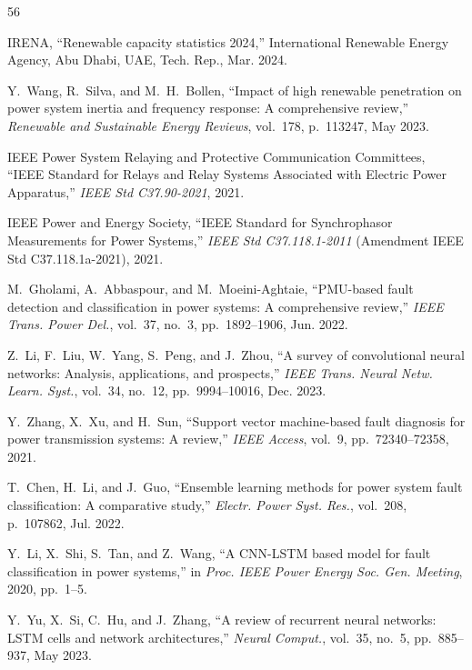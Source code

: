 \documentclass[journal]{IEEEtran}
\begin{document}
\begin{thebibliography}{56}

 IRENA, ``Renewable capacity statistics 2024,'' International Renewable Energy Agency, Abu Dhabi, UAE, Tech. Rep., Mar. 2024.

 Y.~Wang, R.~Silva, and M.~H.~Bollen, ``Impact of high renewable penetration on power system inertia and frequency response: A comprehensive review,'' \textit{Renewable and Sustainable Energy Reviews}, vol.~178, p.~113247, May 2023.

 IEEE Power System Relaying and Protective Communication Committees, ``IEEE Standard for Relays and Relay Systems Associated with Electric Power Apparatus,'' \textit{IEEE Std C37.90-2021}, 2021.

 IEEE Power and Energy Society, ``IEEE Standard for Synchrophasor Measurements for Power Systems,'' \textit{IEEE Std C37.118.1-2011} (Amendment IEEE Std C37.118.1a-2021), 2021.

 M.~Gholami, A.~Abbaspour, and M.~Moeini-Aghtaie, ``PMU-based fault detection and classification in power systems: A comprehensive review,'' \textit{IEEE Trans. Power Del.}, vol.~37, no.~3, pp.~1892--1906, Jun. 2022.

 Z.~Li, F.~Liu, W.~Yang, S.~Peng, and J.~Zhou, ``A survey of convolutional neural networks: Analysis, applications, and prospects,'' \textit{IEEE Trans. Neural Netw. Learn. Syst.}, vol.~34, no.~12, pp.~9994--10016, Dec. 2023.

 Y.~Zhang, X.~Xu, and H.~Sun, ``Support vector machine-based fault diagnosis for power transmission systems: A review,'' \textit{IEEE Access}, vol.~9, pp.~72340--72358, 2021.

 T.~Chen, H.~Li, and J.~Guo, ``Ensemble learning methods for power system fault classification: A comparative study,'' \textit{Electr. Power Syst. Res.}, vol.~208, p.~107862, Jul. 2022.

 Y.~Li, X.~Shi, S.~Tan, and Z.~Wang, ``A CNN-LSTM based model for fault classification in power systems,'' in \textit{Proc. IEEE Power Energy Soc. Gen. Meeting}, 2020, pp.~1--5.

 Y.~Yu, X.~Si, C.~Hu, and J.~Zhang, ``A review of recurrent neural networks: LSTM cells and network architectures,'' \textit{Neural Comput.}, vol.~35, no.~5, pp.~885--937, May 2023.


\end{thebibliography}
\end{document}
